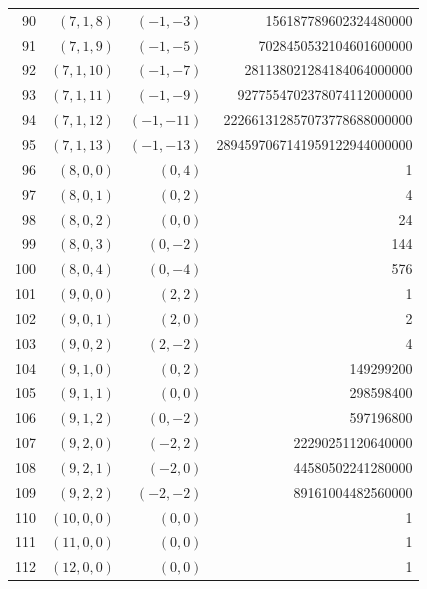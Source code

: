 \begin{longtable}{rrrr}
90 & $(7,1,8)$ & $(-1,-3)$ & 156187789602324480000\\
91 & $(7,1,9)$ & $(-1,-5)$ & 7028450532104601600000\\
92 & $(7,1,10)$ & $(-1,-7)$ & 281138021284184064000000\\
93 & $(7,1,11)$ & $(-1,-9)$ & 9277554702378074112000000\\
94 & $(7,1,12)$ & $(-1,-11)$ & 222661312857073778688000000\\
95 & $(7,1,13)$ & $(-1,-13)$ & 2894597067141959122944000000\\
96 & $(8,0,0)$ & $(0,4)$ & 1\\
97 & $(8,0,1)$ & $(0,2)$ & 4\\
98 & $(8,0,2)$ & $(0,0)$ & 24\\
99 & $(8,0,3)$ & $(0,-2)$ & 144\\
100 & $(8,0,4)$ & $(0,-4)$ & 576\\
101 & $(9,0,0)$ & $(2,2)$ & 1\\
102 & $(9,0,1)$ & $(2,0)$ & 2\\
103 & $(9,0,2)$ & $(2,-2)$ & 4\\
104 & $(9,1,0)$ & $(0,2)$ & 149299200\\
105 & $(9,1,1)$ & $(0,0)$ & 298598400\\
106 & $(9,1,2)$ & $(0,-2)$ & 597196800\\
107 & $(9,2,0)$ & $(-2,2)$ & 22290251120640000\\
108 & $(9,2,1)$ & $(-2,0)$ & 44580502241280000\\
109 & $(9,2,2)$ & $(-2,-2)$ & 89161004482560000\\
110 & $(10,0,0)$ & $(0,0)$ & 1\\
111 & $(11,0,0)$ & $(0,0)$ & 1\\
112 & $(12,0,0)$ & $(0,0)$ & 1\\
\end{longtable}
\endgroup
